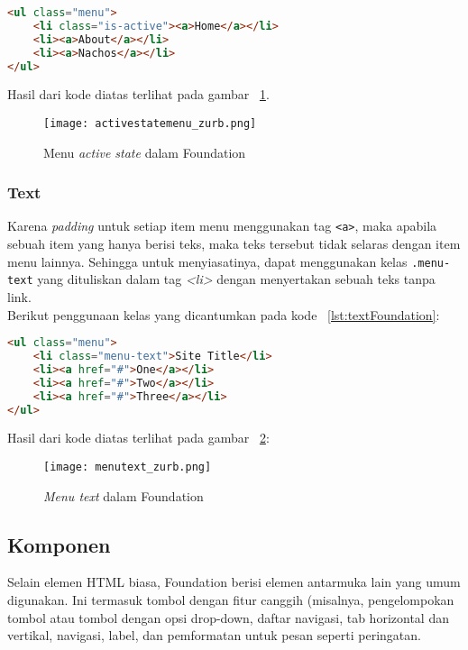 \begin{lstlisting}[style=customhtml, language=HTML,  basicstyle=\ttfamily, frame=single, columns=fullflexible, keepspaces=true, breaklines=true, showstringspaces=false, label={lst:activeStateFoundation}, caption=Active State Foundation 6.] 
<ul class="menu">
	<li class="is-active"><a>Home</a></li>
	<li><a>About</a></li>
	<li><a>Nachos</a></li>
</ul>
\end{lstlisting}
Hasil dari kode diatas terlihat pada gambar ~\ref{fig:activeStateFoundation}.
\begin{figure} [H]
	\centering  
	\texttt{[image: activestatemenu\_zurb.png]}  
	\caption{Menu \textit{active state} dalam Foundation}
	\label{fig:activeStateFoundation}
\end{figure}


\subsubsection{Text}
Karena \textit{padding} untuk setiap item menu menggunakan tag \texttt{<a>}, maka apabila sebuah item yang hanya berisi teks, maka teks tersebut tidak selaras dengan item menu lainnya. Sehingga untuk menyiasatinya, dapat menggunakan kelas \texttt{.menu-text} yang dituliskan dalam tag \textit{<li>} dengan menyertakan sebuah teks tanpa link.\\
Berikut penggunaan kelas yang dicantumkan pada kode ~\ref{lst:textFoundation}:

\begin{lstlisting}[style=customhtml, language=HTML,  basicstyle=\ttfamily, frame=single, columns=fullflexible, keepspaces=true, breaklines=true, showstringspaces=false, label={lst:textFoundation}, caption=Text Foundation 6.]
<ul class="menu">
	<li class="menu-text">Site Title</li>
	<li><a href="#">One</a></li>
	<li><a href="#">Two</a></li>
	<li><a href="#">Three</a></li>
</ul>
\end{lstlisting}
Hasil dari kode diatas terlihat pada gambar ~\ref{fig:menuTextFoundation}:
\begin{figure} [H]
	\centering  
	\texttt{[image: menutext\_zurb.png]}  
	\caption{\textit{Menu text} dalam Foundation}
	\label{fig:menuTextFoundation}
\end{figure}

\subsection{Komponen}
Selain elemen HTML biasa, Foundation berisi elemen antarmuka lain yang umum digunakan. Ini termasuk tombol dengan fitur canggih (misalnya, pengelompokan tombol atau tombol dengan opsi drop-down, daftar navigasi, tab horizontal dan vertikal, navigasi, label, dan pemformatan untuk pesan seperti peringatan.

